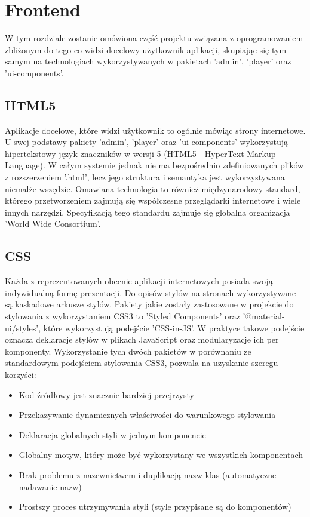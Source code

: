 \chapter{Frontend}
\label{ch:frontend}
W tym rozdziale zostanie omówiona część projektu związana z oprogramowaniem zbliżonym do tego co widzi docelowy użytkownik aplikacji, skupiając się tym samym na technologiach wykorzystywanych w pakietach 'admin', 'player' oraz 'ui-components'.

\section{HTML5}
Aplikacje docelowe, które widzi użytkownik to ogólnie mówiąc strony internetowe. U swej podstawy pakiety 'admin', 'player' oraz 'ui-components' wykorzystują hipertekstowy język znaczników w wersji 5 (HTML5 - HyperText Markup Language). W całym systemie jednak nie ma bezpośrednio zdefiniowanych plików z rozszerzeniem '.html', lecz jego struktura i semantyka jest wykorzystywana niemalże wszędzie. Omawiana technologia to również międzynarodowy standard, którego przetworzeniem zajmują się współczesne przeglądarki internetowe i wiele innych narzędzi. Specyfikacją tego standardu zajmuje się globalna organizacja 'World Wide Consortium'. \cite{HTMLDocs}

\section{CSS}
Każda z reprezentowanych obecnie aplikacji internetowych posiada swoją indywidualną formę prezentacji. Do opisów stylów na stronach wykorzystywane są kaskadowe arkusze stylów. Pakiety jakie zostały zastosowane w projekcie do stylowania z wykorzystaniem CSS3 to 'Styled Components' oraz '@material-ui/styles', które wykorzystują podejście 'CSS-in-JS'. W praktyce takowe podejście oznacza deklaracje stylów w plikach JavaScript oraz modularyzacje ich per komponenty. Wykorzystanie tych dwóch pakietów w porównaniu ze standardowym podejściem stylowania CSS3, pozwala na uzyskanie szeregu korzyści:

\begin{itemize}
    \item Kod źródłowy jest znacznie bardziej przejrzysty
    \item Przekazywanie dynamicznych właściwości do warunkowego stylowania
    \item Deklaracja globalnych styli w jednym komponencie
    \item Globalny motyw, który może być wykorzystany we wszystkich komponentach
    \item Brak problemu z nazewnictwem i duplikacją nazw klas (automatyczne nadawanie nazw)
    \item Prostszy proces utrzymywania styli (style przypisane są do komponentów)
\end{itemize}

